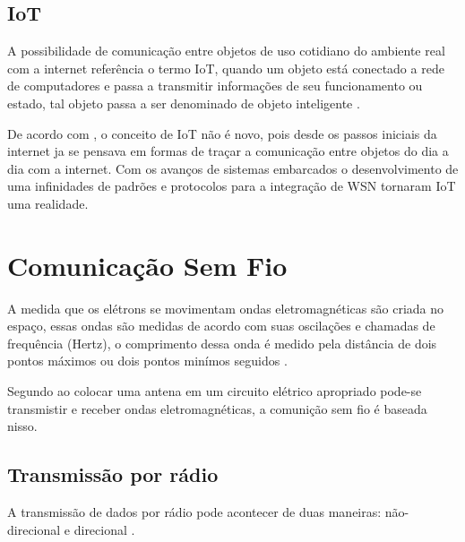     

    \subsection{IoT}
    \par
    A possibilidade de comunicação entre objetos de uso cotidiano do ambiente real com a internet referência o termo IoT, quando um objeto está conectado a rede de computadores e passa a transmitir informações de seu funcionamento ou estado, tal objeto passa a ser denominado de objeto inteligente \cite{iot2016}.
    \par
    De acordo com \citeauthor{iot2017}, o conceito de IoT não é novo, pois desde os passos iniciais da internet ja se pensava em formas de traçar a comunicação entre objetos do dia a dia com a internet. Com os avanços de sistemas embarcados o desenvolvimento de uma infinidades de padrões e protocolos para a integração de WSN tornaram IoT uma realidade.
    
    
\section{Comunicação Sem Fio}
    \par
    A medida que os elétrons se movimentam ondas eletromagnéticas são criada no espaço, essas ondas são medidas de acordo com suas oscilações e chamadas de frequência (Hertz), o comprimento dessa onda é medido pela distância de dois pontos máximos ou dois pontos minímos seguidos \cite{tenenbaum2002}.
    \par
    Segundo \citeauthor{tenenbaum2002} ao colocar uma antena em um circuito elétrico apropriado pode-se  transmistir e receber ondas eletromagnéticas, a comunição sem fio é baseada nisso.
    
    \subsection{Transmissão por rádio}
        
        \par
        A transmissão de dados por rádio pode acontecer de duas maneiras: não-direcional e direcional  \cite{torres2001}.
        
